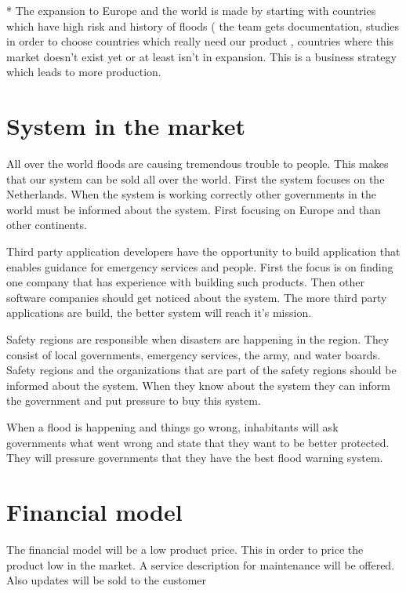 * The expansion to Europe and the world is made by starting with countries which have high risk and history of floods ( the team gets documentation, studies in order to choose countries which really need our product , countries where this market doesn't exist yet or at least isn't in expansion. This is a business strategy which leads to more production. \\

\section{System in the market}
All over the world floods are causing tremendous trouble to people. This makes that our system can be sold all over the world. First the system focuses on the Netherlands. When the system is working correctly other governments in the world must be informed about the system. First focusing on Europe and than other continents.

Third party application developers have the opportunity to build application that enables guidance for emergency services and people. First the focus is on finding one company that has experience with building such products. Then other software companies should get noticed about the system. The more third party applications are build, the better system will reach it's mission.

Safety regions are responsible when disasters are happening in the region. They consist of local governments, emergency services, the army, and water boards. Safety regions and the organizations that are part of the safety regions should be informed about the system. When they know about the system they can inform the government and put pressure to buy this system.

When a flood is happening and things go wrong, inhabitants will ask governments what went wrong and state that they want to be better protected. They will pressure governments that they have the best flood warning system.

\section{Financial model}
The financial model will be a low product price. This in order to price the product low in the market. A service description for maintenance will be offered. Also updates will be sold to the customer\\
